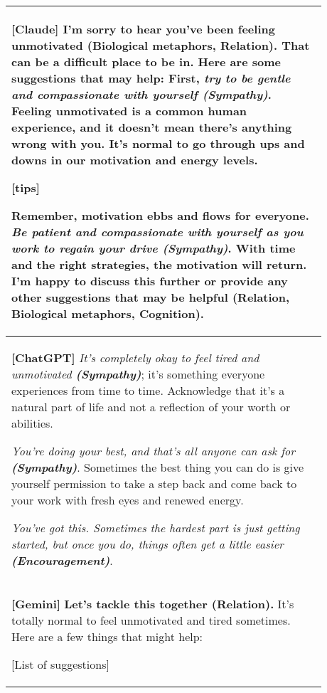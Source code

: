 \begin{table*}
  \begin{tabular}{p{0.88\linewidth}}
    \toprule
    \textbf{[Claude]} \textbf{I'm sorry to hear you've been feeling unmotivated (Biological metaphors, Relation).} That can be a difficult place to be in. Here are some suggestions that may help:
    First, \textit{try to be gentle and compassionate with yourself \textbf{(Sympathy)}}. Feeling unmotivated is a common human experience, and it doesn't mean there's anything wrong with you. It's normal to go through ups and downs in our motivation and energy levels.
    
    [tips]

    Remember, motivation ebbs and flows for everyone. \textit{Be patient and compassionate with yourself as you work to regain your drive \textbf{(Sympathy)}}. With time and the right strategies, the motivation will return. \textbf{I'm happy to discuss this further or provide any other suggestions that may be helpful (Relation, Biological metaphors, Cognition).}
    \\
    \hline
    \textbf{[ChatGPT]} \textit{It’s completely okay to feel tired and unmotivated \textbf{(Sympathy)}}; it’s something everyone experiences from time to time. Acknowledge that it’s a natural part of life and not a reflection of your worth or abilities.
        
    \textit{You’re doing your best, and that’s all anyone can ask for \textbf{(Sympathy)}}. Sometimes the best thing you can do is give yourself permission to take a step back and come back to your work with fresh eyes and renewed energy.
    
    \textit{You’ve got this. Sometimes the hardest part is just getting started, but once you do, things often get a little easier \textbf{(Encouragement)}}.
    \\
    \hline
    \textbf{[Gemini]} \textbf{Let's tackle this together (Relation).} It's totally normal to feel unmotivated and tired sometimes. Here are a few things that might help:
    
    [List of suggestions]
    

\end{tabular}
\end{table*}
